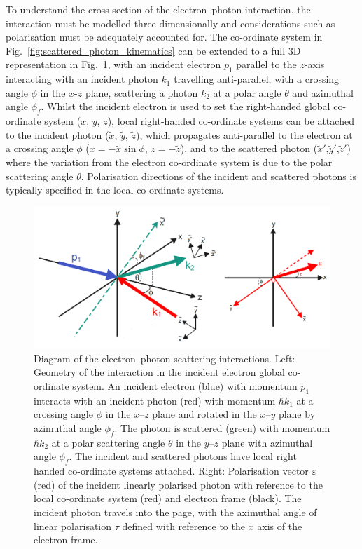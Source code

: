 \documentclass[../main.tex]{subfiles}
\begin{document}
To understand the cross section of the electron--photon interaction, the interaction must be modelled three dimensionally and considerations such as polarisation must be adequately accounted for. The co-ordinate system in Fig.~\ref{fig:scattered_photon_kinematics} can be extended to a full 3D representation in Fig.~\ref{fig:3D_coord_system}, with an incident electron $p_{1}$ parallel to the $z$-axis interacting with an incident photon $k_{1}$ travelling anti-parallel, with a crossing angle $\phi$ in the $x$-$z$ plane, scattering a photon $k_{2}$ at a polar angle $\theta$ and azimuthal angle $\phi_{f}$. Whilst the incident electron is used to set the right-handed global co-ordinate system ($x$, $y$, $z$), local right-handed co-ordinate systems can be attached to the incident photon ($\tilde{x}$, $\tilde{y}$, $\tilde{z}$), which propagates anti-parallel to the electron at a crossing angle $\phi$ ($x = -\tilde{x}\sin\phi$, $z = -\tilde{z}$), and to the scattered photon ($\tilde{x}'$,$\tilde{y}'$,$\tilde{z}'$) where the variation from the electron co-ordinate system is due to the polar scattering angle $\theta$. Polarisation directions of the incident and scattered photons is typically specified in the local co-ordinate systems.  
\begin{figure}[!h]
\centering
\includegraphics[width=\textwidth]{Figures/Photon_Production_by_Inverse_Compton_Scattering/ICS_interaction_polarisation.pdf}
\caption{Diagram of the electron--photon scattering interactions. Left: Geometry of the interaction in the incident electron global co-ordinate system. An incident electron (blue) with momentum $p_{1}$ interacts with an incident photon (red) with momentum $\hbar k_{1}$ at a crossing angle $\phi$ in the $x$--$z$ plane and rotated in the $x$--$y$ plane by azimuthal angle $\phi_{f}$. The photon is scattered (green) with momentum $\hbar k_{2}$ at a polar scattering angle $\theta$ in the $y$--$z$ plane with azimuthal angle $\phi_{f}$. The incident and scattered photons have local right handed co-ordinate systems attached.  Right: Polarisation vector $\varepsilon$ (red) of the incident linearly polarised photon with reference to the local co-ordinate system (red) and electron frame (black). The incident photon travels into the page, with the aximuthal angle of linear polarisation $\tau$ defined with reference to the $x$ axis of the electron frame.}
\label{fig:3D_coord_system}
\end{figure}
\end{document}

